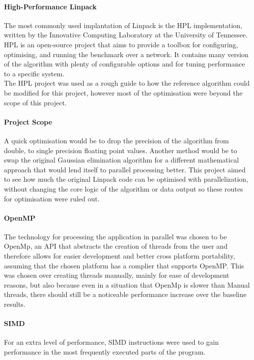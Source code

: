 \documentclass[conference]{acmsiggraph}
\begin{document}
\paragraph{High-Performance Linpack}
The most commonly used implantation of Linpack is the HPL implementation, written by the Innovative Computing Laboratory at the University of Tennessee. 
HPL is an open-source project that aims to provide a toolbox for configuring, optimising, and running the benchmark over a network. 
It contains many version of the algorithm with plenty of configurable options and for tuning performance to a specific system.
\\
The HPL project was used as a rough guide to how the reference algorithm could be modified for this project, however most of the optimisation were beyond the scope of this project.

\paragraph{Project Scope}
A quick optimisation would be to drop the precision of the algorithm from double, to single precision floating point values.
Another method would be to swap the original Gaussian elimination algorithm for a different mathematical approach that would lend itself to parallel processing better.
This project aimed to see how much the original Linpack code can be optimised with parallelization, without changing the core logic of the algorithm or data output so these routes for optimisation were ruled out.

\paragraph{OpenMP}
The technology for processing the application in parallel was chosen to be OpenMp, an API that abstracts the creation of threads from the user and therefore allows for easier development and better cross platform portability, assuming that the chosen platform has a complier that supports OpenMP.
This was chosen over creating threads manually, mainly for ease of development reasons, but also because even in a situation that OpenMp is slower than Manual threads, there should still be a noticeable performance increase over the baseline results.

\paragraph{SIMD}
For an extra level of performance, SIMD instructions were used to gain performance in the most frequently executed parts of the program.
\end{document}

